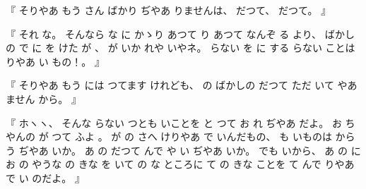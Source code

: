 %
『
そりやあ
もう
さん
ばかり
ぢやあ
りませんは、
%
だつて、
%
だつて。
』

%
『
それ
な。
%
そんなら
な
に
かゝり
あつて
り
あつて
なんぞ
る
より、
%
ばかしの
で%
に
を
けた
が
、
%
%
が
いか
れや
いやネ。
%
らない
を
に
する
らない
ことは
りやあ
い
もの！。
』

%
『
そりやあ
もう
には
つてます
けれども、
%
の
ばかしの
だつて
ただ%
いて
やあ
ません
から。
』

%
『
ホヽヽ、
%
そんな
らない
つとも
いことを
と
つて
お
れ
ぢやあ
だよ。
%
お
ちやんの
が
つて
ふよ
。
%
%
が
の
さへ
けりやあ
で
いんだもの、
%
も
いものは
からう
ぢやあ
いか。
%
あ
の
だつて
んで
や
い
ぢやあ
いか。
%
でも
いから、
%
あ
の
に
お
の
やうな
%
の
きな
を
いて
%
の
な
ところに
て
%
の
きな
ことを
て
んで
りやあ
で
い
のだよ。
』
